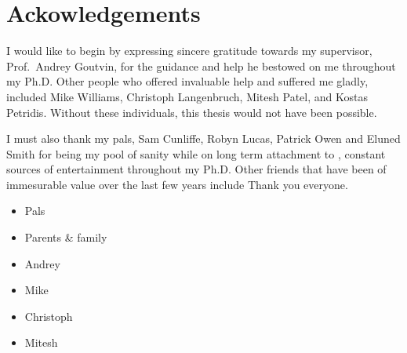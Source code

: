 \clearpage
\chapter*{\centering Ackowledgements}
\begin{center}
  \begin{minipage}{0.8\textwidth}
    I would like to begin by expressing sincere gratitude towards my supervisor, Prof.~Andrey Goutvin,
    for the guidance and help he bestowed on me throughout my Ph.D.
    Other people who offered invaluable help and suffered me gladly, included
    Mike Williams,
    Christoph Langenbruch,
    Mitesh Patel, and
    Kostas Petridis.
    Without these individuals, this thesis would not have been possible.

    I must also thank my pals, Sam Cunliffe, Robyn Lucas, Patrick Owen and Eluned Smith for being my
    pool of sanity while on long
    term attachment to \cern, constant sources of entertainment throughout my Ph.D.
    Other friends that have been of immesurable value over the last few years include
    Thank you everyone.
    \begin{itemize}
      \item Pals
      \item Parents \& family
      \item Andrey
      \item Mike
      \item Christoph
      \item Mitesh
    \end{itemize}
  \end{minipage}
\end{center}



